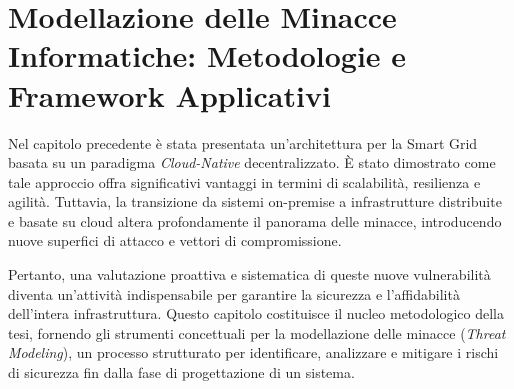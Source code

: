 \afterpage{\blankpage}
\newpage


\chapter{Modellazione delle Minacce Informatiche: Metodologie e Framework Applicativi}






Nel capitolo precedente è stata presentata un'architettura per la Smart Grid basata su un paradigma \textit{Cloud-Native} decentralizzato. È stato dimostrato come tale approccio offra significativi vantaggi in termini di scalabilità, resilienza e agilità. Tuttavia, la transizione da sistemi on-premise a infrastrutture distribuite e basate su cloud altera profondamente il panorama delle minacce, introducendo nuove superfici di attacco e vettori di compromissione.


Pertanto, una valutazione proattiva e sistematica di queste nuove vulnerabilità diventa un'attività indispensabile per garantire la sicurezza e l'affidabilità dell'intera infrastruttura. Questo capitolo costituisce il nucleo metodologico della tesi, fornendo gli strumenti concettuali per la modellazione delle minacce (\textit{Threat Modeling}), un processo strutturato per identificare, analizzare e mitigare i rischi di sicurezza fin dalla fase di progettazione di un sistema.

